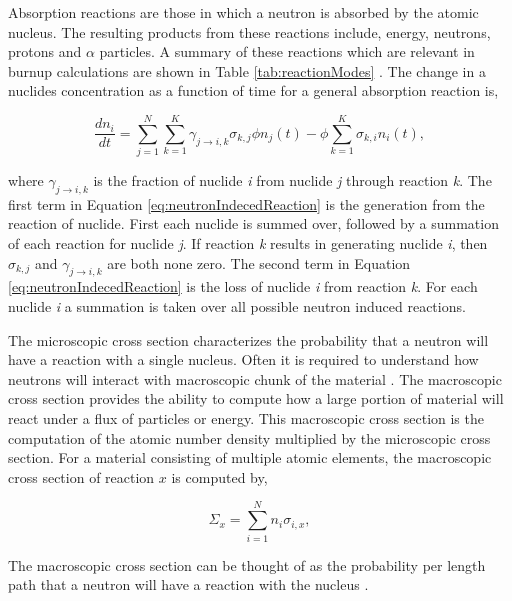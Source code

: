 Absorption reactions are those in which a neutron is absorbed by the atomic nucleus. The resulting products from these reactions include, energy, neutrons, protons and $\alpha$ particles. A summary of these reactions which are relevant in burnup calculations are shown in Table \ref{tab:reactionModes} \cite{pusaThesis}. The change in a nuclides concentration as a function of time for a general absorption reaction is,

\begin{equation}
    \frac{dn_{i}}{dt} = \sum_{j=1}^{N} \sum_{k=1}^{K}\gamma_{j\rightarrow i,k}\sigma_{k,j}\phi n_{j}(t) - \phi\sum_{k=1}^{K} \sigma_{k,i}n_{i}(t),
    \label{eq:neutronIndecedReaction}
\end{equation}

\noindent where $\gamma_{j\rightarrow i,k}$ is the fraction of nuclide \textit{i} from nuclide \textit{j} through reaction \textit{k}. The first term in Equation  \ref{eq:neutronIndecedReaction} is the generation from the reaction of nuclide. First each nuclide is summed over, followed by a summation of each reaction for nuclide \textit{j}. If reaction \textit{k} results in generating nuclide \textit{i}, then $\sigma_{k,j}$ and $\gamma_{j\rightarrow i,k}$ are both none zero. The second term in Equation \ref{eq:neutronIndecedReaction} is the loss of nuclide \textit{i} from reaction \textit{k}. For each nuclide \textit{i} a summation is taken over all possible neutron induced reactions. 

The microscopic cross section characterizes the probability that a neutron will have a reaction with a single nucleus. Often it is required to understand how neutrons will interact with macroscopic chunk of the material \cite{duderstadt1976}. The macroscopic cross section provides the ability to compute how a large portion of material will react under a flux of particles or energy. This macroscopic cross section is the computation of the atomic number density multiplied by the microscopic cross section. For a material consisting of multiple atomic elements, the macroscopic cross section of reaction $x$ is computed by,

\begin{equation}
    \Sigma_{x} = \sum_{i=1}^{N}n_{i}\sigma_{i,x},
\end{equation}

\noindent The macroscopic cross section can be thought of as the probability per length path that a neutron will have a reaction with the nucleus \cite{duderstadt1976}. 

